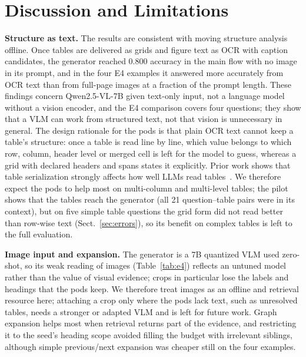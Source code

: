 \documentclass[runningheads]{llncs}
\begin{document}
\section{Discussion and Limitations}
\textbf{Structure as text.} The results are consistent with moving structure analysis offline. Once tables are delivered as grids and figure text as OCR with caption candidates, the generator reached 0.800 accuracy in the main flow with no image in its prompt, and in the four E4 examples it answered more accurately from OCR text than from full-page images at a fraction of the prompt length. These findings concern Qwen2.5-VL-7B given text-only input, not a language model without a vision encoder, and the E4 comparison covers four questions; they show that a VLM can work from structured text, not that vision is unnecessary in general. The design rationale for the pods is that plain OCR text cannot keep a table's structure: once a table is read line by line, which value belongs to which row, column, header level or merged cell is left for the model to guess, whereas a grid with declared headers and spans states it explicitly. Prior work shows that table serialization strongly affects how well LLMs read tables~\cite{sui2024table}. We therefore expect the pods to help most on multi-column and multi-level tables; the pilot shows that the tables reach the generator (all 21 question--table pairs were in its context), but on five simple table questions the grid form did not read better than row-wise text (Sect.~\ref{sec:errors}), so its benefit on complex tables is left to the full evaluation.

\textbf{Image input and expansion.} The generator is a 7B quantized VLM used zero-shot, so its weak reading of images (Table~\ref{tab:e4}) reflects an untuned model rather than the value of visual evidence; crops in particular lose the labels and headings that the pods keep. We therefore treat images as an offline and retrieval resource here; attaching a crop only where the pods lack text, such as unresolved tables, needs a stronger or adapted VLM and is left for future work. Graph expansion helps most when retrieval returns part of the evidence, and restricting it to the seed's heading scope avoided filling the budget with irrelevant siblings, although simple previous/next expansion was cheaper still on the four examples.
\end{document}
